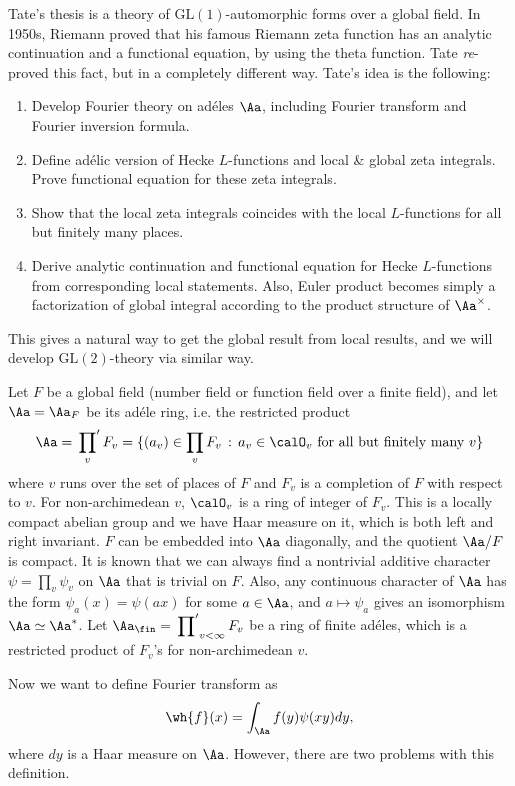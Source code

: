 \documentclass{article}
\newcommand{\GL}{\mathrm{GL}}
\begin{document}
Tate's thesis is a theory of $\GL(1)$-automorphic forms over a global field. In 1950s, Riemann proved that his famous Riemann zeta function has an analytic continuation and a functional equation, by using the theta function. Tate \emph{re}-proved this fact, but in a completely different way.
Tate's idea is the following:
\begin{enumerate}
\item Develop Fourier theory on ad\'eles $\Aa$, including Fourier transform and Fourier inversion formula.
\item Define ad\'elic version of Hecke $L$-functions and local \& global zeta integrals. Prove functional equation for these zeta integrals. 
\item Show that the local zeta integrals coincides with the local $L$-functions for all but finitely many places. 
\item Derive analytic continuation and functional equation for Hecke $L$-functions  from corresponding local statements. Also, Euler product becomes simply a factorization of global integral according to the product structure of $\Aa^{\times}$. 
\end{enumerate}
This gives a natural way to get the global result from local results, and we will develop $\GL(2)$-theory via similar way. 


Let $F$ be a global field (number field or function field over a finite field), and let $\Aa = \Aa_{F}$ be its ad\'ele ring, i.e. the restricted product
$$
\Aa = \sideset{}{'}\prod_{v} F_{v} = \{ (a_{v}) \in \prod_{v} F_{v}\,:\, a_{v} \in \calO_{v}\text{ for all but finitely many }v\}
$$
where $v$ runs over the set of places of $F$ and $F_{v}$ is a completion of $F$ with respect to $v$. For non-archimedean $v$, $\calO_{v}$ is a ring of integer of $F_{v}$. 
This is a locally compact abelian group and we have Haar measure on it, which is both left and right invariant. 
$F$ can be embedded into $\Aa$ diagonally, and the quotient $\Aa/F$ is compact. It is known that we can always find a nontrivial additive character $\psi = \prod_{v}\psi_{v}$ on $\Aa$ that is trivial on $F$. 
Also, any continuous character of $\Aa$ has the form $\psi_{a}(x) = \psi(ax)$ for some $a\in \Aa$, and $a\mapsto \psi_{a}$ gives an isomorphism $\Aa \simeq \Aa^{*}$. 
Let $\Aa_{\fin} = \sideset{}{'}\prod_{v<\infty} F_{v}$ be a ring of finite ad\'eles, which is a restricted product of $F_{v}$'s for non-archimedean $v$. 

Now we want to define Fourier transform  as 
$$
\wh{f}(x) = \int_{\Aa}f(y)\psi(xy)dy,
$$
where $dy$ is a Haar measure on $\Aa$. However, there are two problems with this definition. 
\end{document}
